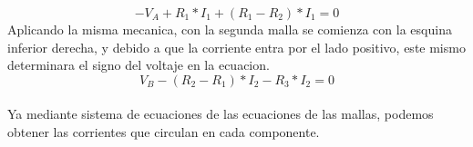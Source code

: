     \begin{equation*}
    -V_A + R_1 * I_1 + (R_1-R_2) * I_1 = 0
    \end{equation*}
    Aplicando la misma mecanica, con la segunda malla se comienza con la esquina inferior derecha, y debido a que la corriente entra por el lado positivo, este mismo determinara el signo del voltaje en la ecuacion. \\

    \begin{equation*}
    V_B - (R_2 - R_1)*I_2 - R_3*I_2 = 0
    \end{equation*}
    \\
    Ya mediante sistema de ecuaciones de las ecuaciones de las mallas, podemos obtener las corrientes que circulan en cada componente.

